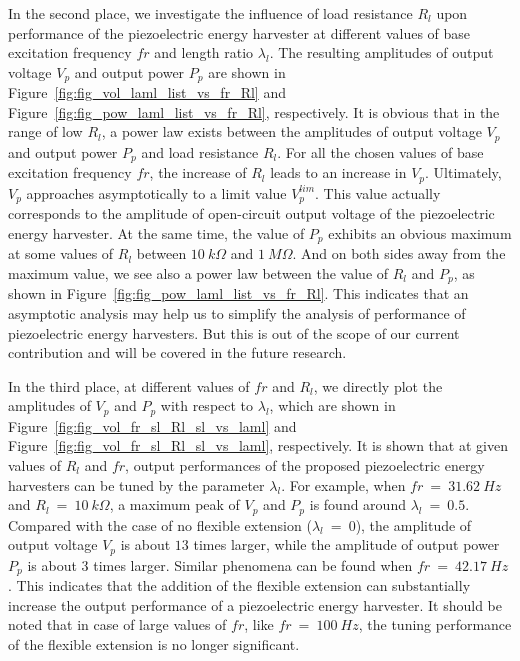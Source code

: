 \documentclass{elsarticle}
\begin{document}
In the second place, we investigate the influence of load resistance $R_l$ upon performance of the piezoelectric energy harvester at different values of base excitation frequency $fr$ and length ratio $\lambda_l$. The resulting amplitudes of output voltage $V_p$ and output power $P_p$ are shown in Figure~\ref{fig:fig_vol_laml_list_vs_fr_Rl} and Figure~\ref{fig:fig_pow_laml_list_vs_fr_Rl}, respectively. It is obvious that in the range of low $R_l$, a power law exists between the amplitudes of output voltage $V_p$ and output power $P_p$ and load resistance $R_l$. For all the chosen values of base excitation frequency $fr$, the increase of $R_l$ leads to an increase in $V_p$. Ultimately, $V_p$ approaches asymptotically to a limit value $V_p^{lim}$. This value actually corresponds to the amplitude of open-circuit output voltage of the piezoelectric energy harvester. At the same time, the value of $P_p$ exhibits an obvious maximum at some values of $R_l$ between $10\ k\Omega$ and $1\ M\Omega$. And on both sides away from the maximum value, we see also a power law between the value of $R_l$ and $P_p$, as shown in Figure~\ref{fig:fig_pow_laml_list_vs_fr_Rl}. This indicates that an asymptotic analysis may help us to simplify the analysis of performance of piezoelectric energy harvesters. But this is out of the scope of our current contribution and will be covered in the future research.




In the third place, at different values of $fr$ and $R_l$, we directly plot the amplitudes of $V_p$ and $P_p$ with respect to $\lambda_l$, which are shown in Figure~\ref{fig:fig_vol_fr_sl_Rl_sl_vs_laml} and Figure~\ref{fig:fig_vol_fr_sl_Rl_sl_vs_laml}, respectively. It is shown that at given values of $R_l$ and $fr$, output performances of the proposed piezoelectric energy harvesters can be tuned by the parameter $\lambda_l$. For example, when $fr\ =\ 31.62\ Hz$ and $R_l\ =\ 10\ k\Omega$, a maximum peak of $V_p$ and $P_p$ is found around $\lambda_l\ =\ 0.5$. Compared with the case of no flexible extension ($\lambda_l\ =\ 0$), the amplitude of output voltage $V_p$ is about $13$ times larger, while the amplitude of output power $P_p$ is about $3$ times larger. Similar phenomena can be found when $fr\ =\ 42.17\ Hz$. This indicates that the addition of the flexible extension can substantially increase the output performance of a piezoelectric energy harvester. It should be noted that in case of large values of $fr$, like $fr\ =\ 100\ Hz$, the tuning performance of the flexible extension is no longer significant.
\end{document}
